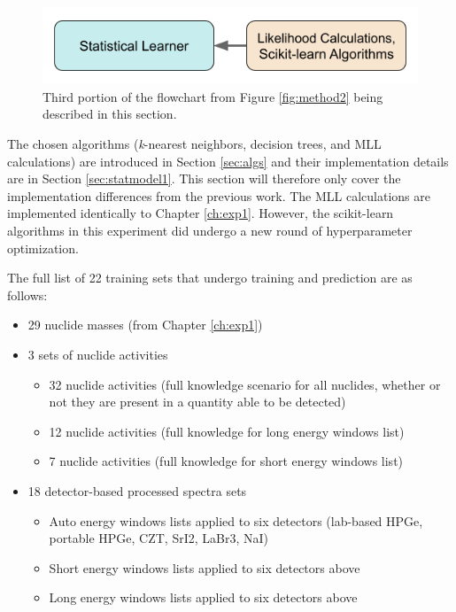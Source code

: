 
\begin{figure}[H]
  \centering
  \includegraphics[width=0.7\linewidth]{./chapters/exp2/methodology2_3.png}
  \caption[Third portion of the flowchart from Figure \ref{fig:method2}]
          {Third portion of the flowchart from Figure \ref{fig:method2} being 
           described in this section.}
\end{figure}

The chosen algorithms (\textit{k}-nearest neighbors, decision trees, and
\gls{MLL} calculations) are introduced in Section \ref{sec:algs} and their
implementation details are in Section \ref{sec:statmodel1}.  This section will
therefore only cover the implementation differences from the previous work.
The \gls{MLL} calculations are implemented identically to Chapter
\ref{ch:exp1}.  However, the scikit-learn algorithms in this experiment did
undergo a new round of hyperparameter optimization.

The full list of 22 training sets that undergo training and prediction are as
follows: 
\begin{itemize}
  \item 29 nuclide masses (from Chapter \ref{ch:exp1})
  \item 3 sets of nuclide activities
    \begin{itemize}
      \item 32 nuclide activities (full knowledge scenario for all nuclides, 
            whether or not they are present in a quantity able to be detected)
      \item 12 nuclide activities (full knowledge for long energy windows list)
      \item 7 nuclide activities (full knowledge for short energy windows list)
    \end{itemize}
  \item 18 detector-based processed spectra sets
    \begin{itemize}
      \item Auto energy windows lists applied to six detectors (lab-based 
            \gls{HPGe}, portable \gls{HPGe}, \gls{CZT}, \gls{SrI2}, \gls{LaBr3}, 
            \gls{NaI})
      \item Short energy windows lists applied to six detectors above
      \item Long energy windows lists applied to six detectors above
    \end{itemize}
\end{itemize}

